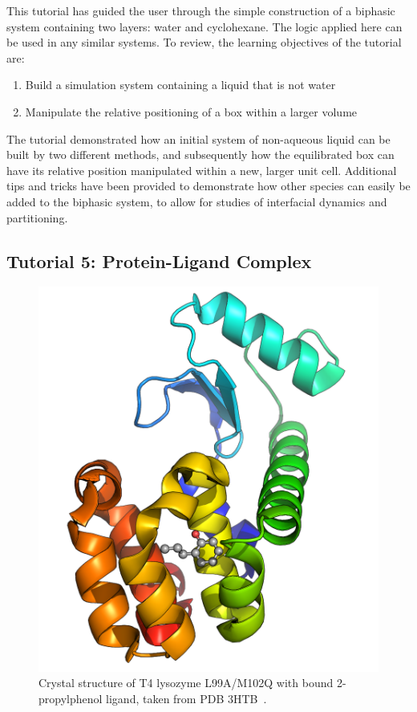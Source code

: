 \documentclass[9pt,tutorial,pubversion]{livecoms}
\begin{document}
This tutorial has guided the user through the simple construction of a biphasic system containing two layers: water and cyclohexane. The logic applied here can be used in any similar systems. To review, the learning objectives of the tutorial are:

\begin{enumerate}
	\item Build a simulation system containing a liquid that is not water
	\item Manipulate the relative positioning of a box within a larger volume
\end{enumerate}

The tutorial demonstrated how an initial system of non-aqueous liquid can be built by two different methods, and subsequently how the equilibrated box can have its relative position manipulated within a new, larger unit cell. Additional tips and tricks have been provided to demonstrate how other species can easily be added to the biphasic system, to allow for studies of interfacial dynamics and partitioning.



\subsection{Tutorial 5: Protein-Ligand Complex} \label{prot_lig}

\begin{figure}[h]
\centering
\includegraphics{lysozyme_complex_3htb}
\caption{Crystal structure of T4 lysozyme L99A/M102Q with bound 2-propylphenol ligand, taken from PDB 3HTB~\cite{Boyce2009}.}
\label{lyso_complex_3htb_fig}
\end{figure}
\end{document}
